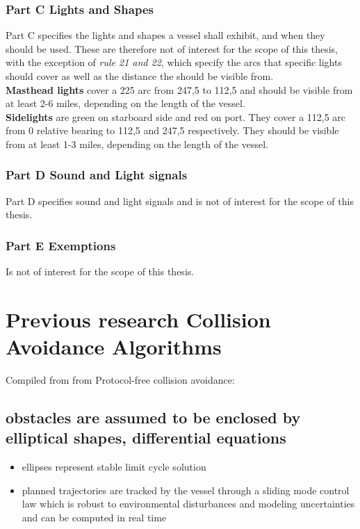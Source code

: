\subsubsection{Part C Lights and Shapes}
Part C specifies the lights and shapes a vessel shall exhibit, and when they should be used. These are therefore not of interest for the scope of this thesis, with the exception of \textit{rule 21 and 22}, which specify the arcs that specific lights should cover as well as the distance the should be visible from.
\\
\textbf{Masthead lights} cover a 225 \textdegree arc from 247,5 \textdegree to 112,5 \textdegree and should be visible from at least 2-6 miles, depending on the length of the vessel.\\
\textbf{Sidelights} are green on starboard side and red on port. They cover a 112,5 arc from 0 relative bearing to 112,5 and 247,5 respectively. They should be visible from at least 1-3 miles, depending on the length of the vessel.
\subsubsection{Part D Sound and Light signals}
Part D specifies sound and light signals and is not of interest for the scope of this thesis.
\subsubsection{Part E Exemptions}
Is not of interest for the scope of this thesis.


\section{Previous research Collision Avoidance Algorithms}
Compiled from from \cite{liu2016unmanned}
Protocol-free collision avoidance:


\subsection{obstacles are assumed to be enclosed by elliptical shapes, differential equations } \cite{soltan2009trajectory}
\begin{itemize}
    \con obstacles approximated as elliptic shapes
    \con Focuses mostly on under-actuated unmanned surface vessels
    \con Does not mention COLREG
    \pro  only the current information about the obstacles and the target are required for real-time trajectory planning
    \item ellipses represent stable limit cycle solution
    \item planned trajectories are tracked by the vessel through a sliding mode control law which is robust to environmental  disturbances  and  modeling uncertainties and can be computed in real time
\end{itemize}

